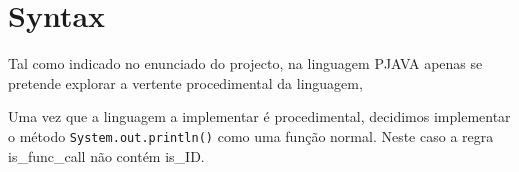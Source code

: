 \documentclass[a4paper]{article}
\title{\documentTitle}
\author{\documentAuthors{}}
\begin{document}
\renewcommand{\figurename}{Figure}
\maketitle
\cleardoublepage

\tableofcontents
\cleardoublepage

\setlength{\parindent}{1cm}
\setlength{\parskip}{0.3cm}

\section {Syntax}
\indent \indent Tal como indicado no enunciado do projecto, na linguagem PJAVA apenas se pretende explorar a vertente procedimental da linguagem, 

 
\indent Uma vez que a linguagem a implementar é procedimental, decidimos implementar o método \texttt{System.out.println()} como uma função normal.
Neste caso a regra is\_func\_call não contém is\_ID. 

\cleardoublepage
\end{document}
